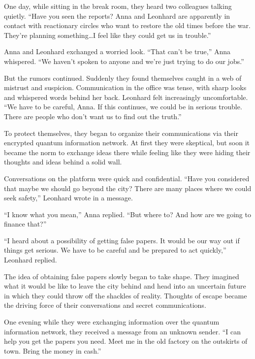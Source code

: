 \documentclass[
]{article}
\begin{document}
One day, while sitting in the break room, they heard two colleagues
talking quietly. ``Have you seen the reports? Anna and Leonhard are
apparently in contact with reactionary circles who want to restore the
old times before the war. They're planning something\ldots I feel like
they could get us in trouble.''

Anna and Leonhard exchanged a worried look. ``That can't be true,'' Anna
whispered. ``We haven't spoken to anyone and we're just trying to do our
jobs.''

But the rumors continued. Suddenly they found themselves caught in a web
of mistrust and suspicion. Communication in the office was tense, with
sharp looks and whispered words behind her back. Leonhard felt
increasingly uncomfortable. ``We have to be careful, Anna. If this
continues, we could be in serious trouble. There are people who don't
want us to find out the truth.''

To protect themselves, they began to organize their communications via
their encrypted quantum information network. At first they were
skeptical, but soon it became the norm to exchange ideas there while
feeling like they were hiding their thoughts and ideas behind a solid
wall.

Conversations on the platform were quick and confidential. ``Have you
considered that maybe we should go beyond the city? There are many
places where we could seek safety,'' Leonhard wrote in a message.

``I know what you mean,'' Anna replied. ``But where to? And how are we
going to finance that?''

``I heard about a possibility of getting false papers. It would be our
way out if things get serious. We have to be careful and be prepared to
act quickly,'' Leonhard replied.

The idea of \hspace{0pt}\hspace{0pt}obtaining false papers slowly began
to take shape. They imagined what it would be like to leave the city
behind and head into an uncertain future in which they could throw off
the shackles of reality. Thoughts of escape became the driving force of
their conversations and secret communications.

One evening while they were exchanging information over the quantum
information network, they received a message from an unknown sender. ``I
can help you get the papers you need. Meet me in the old factory on the
outskirts of town. Bring the money in cash.''
\end{document}
